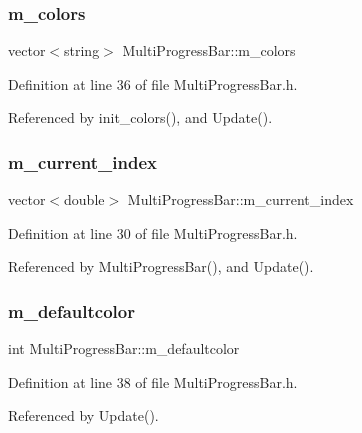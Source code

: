 \subsubsection{m\+\_\+colors}
{\footnotesize\ttfamily vector$<$string$>$ Multi\+Progress\+Bar\+::m\+\_\+colors\hspace{0.3cm}{\ttfamily [private]}}



Definition at line 36 of file Multi\+Progress\+Bar.\+h.



Referenced by init\+\_\+colors(), and Update().

\mbox{\label{classMultiProgressBar_a3810b1b4f80f6430a19fd3f699072f66_a3810b1b4f80f6430a19fd3f699072f66}} 
\subsubsection{m\+\_\+current\+\_\+index}
{\footnotesize\ttfamily vector$<$double$>$ Multi\+Progress\+Bar\+::m\+\_\+current\+\_\+index\hspace{0.3cm}{\ttfamily [protected]}}



Definition at line 30 of file Multi\+Progress\+Bar.\+h.



Referenced by Multi\+Progress\+Bar(), and Update().

\mbox{\label{classMultiProgressBar_a0feeb1e41adf9e50b2b25e70a39fddb5_a0feeb1e41adf9e50b2b25e70a39fddb5}} 
\subsubsection{m\+\_\+defaultcolor}
{\footnotesize\ttfamily int Multi\+Progress\+Bar\+::m\+\_\+defaultcolor\hspace{0.3cm}{\ttfamily [private]}}



Definition at line 38 of file Multi\+Progress\+Bar.\+h.



Referenced by Update().

\mbox{\label{classMultiProgressBar_a3befa397116ae560dd86250d5caada4d_a3befa397116ae560dd86250d5caada4d}} 
